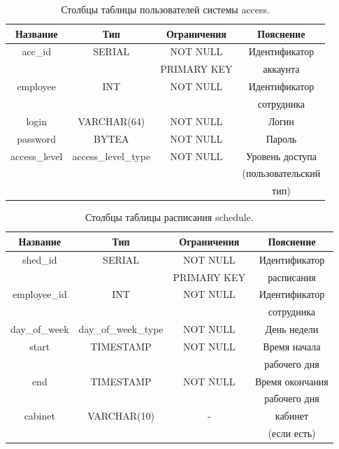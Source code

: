 \documentclass[a4paper,14pt]{article}
\begin{document}
\newpage
\begin{table}[!h]
	\caption{Столбцы таблицы пользователей системы access.}
	\begin{center}
		\begin{tabular}{| c | c | c | c |}
	 	\hline
		Название & Тип & Ограничения & Пояснение \\ \hline
		acc\_id & SERIAL & NOT NULL & Идентификатор \\
		 &  & PRIMARY KEY & аккаунта \\ \hline
		employee & INT & NOT NULL & Идентификатор \\
		& &  & сотрудника \\ \hline
		login & VARCHAR(64) & NOT NULL & Логин \\ \hline
		password & BYTEA & NOT NULL & Пароль \\ \hline
		access\_level & access\_level\_type & NOT NULL & Уровень доступа \\ 
		& &  & (пользовательский \\ 
		& &  & тип) \\ \hline
	\end{tabular}
	\end{center}
\end{table}

\begin{table}[!h]
	\caption{Столбцы таблицы расписания schedule.}
	\begin{center}
		\begin{tabular}{| c | c | c | c |}
	 	\hline
		Название & Тип & Ограничения & Пояснение \\ \hline
		shed\_id & SERIAL & NOT NULL &  Идентификатор \\
		&  & PRIMARY KEY & расписания \\ \hline
		employee\_id & INT & NOT NULL & Идентификатор \\
		 &  &  & сотрудника \\ \hline
		day\_of\_week & day\_of\_week\_type & NOT NULL & День недели  \\ \hline
		start & TIMESTAMP & NOT NULL & Время начала \\ 
		 &  &  & рабочего дня \\ \hline
		end & TIMESTAMP & NOT NULL & Время окончания \\
		 &  &  & рабочего дня \\ \hline
		cabinet & VARCHAR(10) & - & кабинет \\
		&  & & (если есть) \\ \hline
	\end{tabular}
	\end{center}
\end{table}
\end{document}
